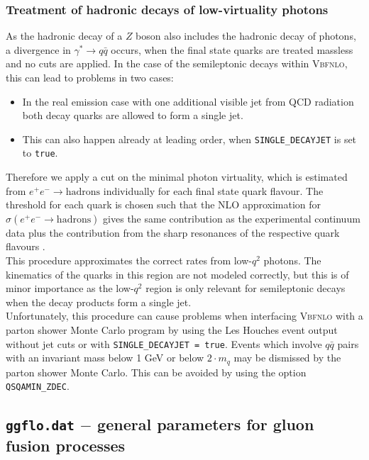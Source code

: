 \documentclass[english,12pt]{article}
\begin{document}
\subsubsection{Treatment of hadronic decays of low-virtuality photons}
\label{lowvirt}

      As the hadronic decay of a $Z$ boson also includes the hadronic decay of photons,
      a divergence in $\gamma^*\to q\bar{q}$ occurs, when the final state quarks are treated massless
      and no cuts are applied.
      In the case of the semileptonic decays within \textsc{Vbfnlo}, this can lead to problems in two cases:
      \begin{itemize}
       \item In the real emission case with one additional visible jet from QCD radiation both decay quarks
             are allowed to form a single jet. 
       \item This can also happen already at leading order, when {\tt SINGLE\_DECAYJET} is set to {\tt true}.
      \end{itemize}
      Therefore we apply a cut on the minimal photon virtuality, which is estimated from $e^+e^-\to \text{hadrons}$
      individually for each final state quark flavour. The threshold for each quark is chosen such
      that the NLO approximation for $\sigma(e^+e^-\to \text{hadrons})$ gives the same contribution as the experimental
      continuum data plus the contribution from the sharp resonances of the respective quark flavours \cite{Beringer:1900zz}.\\
      This procedure approximates the correct rates from low-$q^2$ photons. The kinematics of the quarks
      in this region are not modeled correctly, but this is of minor importance as the low-$q^2$ region
      is only relevant for semileptonic decays when the decay products form a single jet.\\
      Unfortunately, this procedure can cause problems when interfacing \textsc{Vbfnlo} with
      a parton shower Monte Carlo program by using the Les Houches event output without jet cuts or
      with {\tt SINGLE\_DECAYJET = true}.
      Events which involve $q\bar{q}$ pairs with an invariant mass below 1 GeV or below $2 \cdot m_q$ may
      be dismissed by the parton shower Monte Carlo. This can be avoided by using the option
      {\tt QSQAMIN\_ZDEC}.



\subsection{{\tt ggflo.dat} $-$ general parameters for gluon fusion processes}
\end{document}
